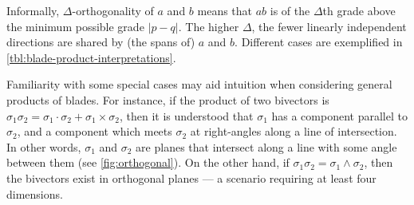 Informally, $Δ$-orthogonality of $a$ and $b$ means that $ab$ is of the $Δ$th grade above the minimum possible grade $|p - q|$.
The higher $Δ$, the fewer linearly independent directions are shared by (the spans of) $a$ and $b$.
Different cases are exemplified in \cref{tbl:blade-product-interpretations}.


Familiarity with some special cases may aid intuition when considering general products of blades.
For instance, if the product of two bivectors is $σ_1σ_2 = σ_1·σ_2 + σ_1×σ_2$, then it is understood that $σ_1$ has a component parallel to $σ_2$, and a component which meets $σ_2$ at right-angles along a line of intersection.
In other words, $σ_1$ and $σ_2$ are planes that intersect along a line with some angle between them (see \cref{fig:orthogonal}).
On the other hand, if $σ_1σ_2 = σ_1∧σ_2$, then the bivectors exist in orthogonal planes --- a scenario requiring at least four dimensions.



